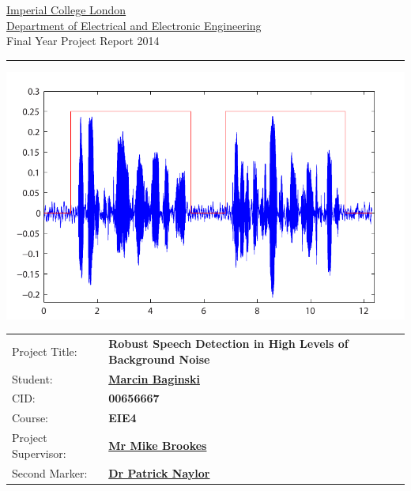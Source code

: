 \documentclass[11pt, a4paper, oneside]{Thesis} %
\begin{document}
\begin{titlepage}
\setlength{\parindent}{0pt}
\setlength{\parskip}{0pt}

{
\Large
\raggedright
\href{http://www.imperial.ac.uk}{Imperial College London}\\[17pt]
\href{http://www.imperial.ac.uk/electricalengineering}{Department of Electrical and Electronic Engineering}\\[17pt]
Final Year Project Report 2014\\[17pt]

}
\rule{\columnwidth}{3pt}

\vfill

\centering
\includegraphics[width=0.9\columnwidth,keepaspectratio]{Figures/titlepage/titlepage.pdf}

\vfill

\setlength{\tabcolsep}{0pt}
\begin{tabular}{p{40mm}p{\dimexpr\columnwidth-40mm}}
Project Title: & \textbf{Robust Speech Detection in High Levels
of Background Noise} \\[12pt]
Student: & \href{mailto:marcin.baginski91@gmail.com}{\textbf{Marcin Baginski}} \\[12pt]
CID: & \textbf{00656667} \\[12pt]
Course: & \textbf{EIE4} \\[12pt]
Project Supervisor: & \href{mailto:mike.brookes@imperial.ac.uk}{\textbf{Mr Mike Brookes}} \\[12pt]
Second Marker: & \href{mailto:patrick.naylor@imperial.ac.uk}{\textbf{Dr Patrick Naylor}} \\
\end{tabular}
\end{titlepage}
\end{document}
